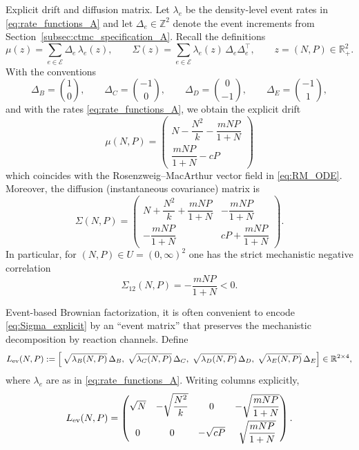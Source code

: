 \documentclass[pdflatex,sn-mathphys-ay]{sn-jnl}
\theoremstyle{thmstyleone}
\theoremstyle{definition}
\theoremstyle{remark}
\begin{document}
Explicit drift and diffusion matrix. Let $\lambda_e$ be the density-level event rates in \eqref{eq:rate_functions_A} and let $\Delta_e\in\mathbb{Z}^2$ denote
the event increments from Section~\ref{subsec:ctmc_specification_A}. Recall the definitions
\begin{equation}\label{eq:mu_Sigma_definitions_A}
\mu(z)=\sum_{e\in\mathcal E}\Delta_e\,\lambda_e(z),
\qquad
\Sigma(z)=\sum_{e\in\mathcal E}\lambda_e(z)\,\Delta_e\Delta_e^\top,
\qquad z=(N,P)\in\mathbb{R}_+^2.
\end{equation}
With the conventions
\[
\Delta_B=\binom{1}{0},\qquad
\Delta_C=\binom{-1}{0},\qquad
\Delta_D=\binom{0}{-1},\qquad
\Delta_E=\binom{-1}{1},
\]
and with the rates \eqref{eq:rate_functions_A}, we obtain the explicit drift
\begin{equation}\label{eq:mu_explicit}
\mu(N,P)=
\begin{pmatrix}
N-\dfrac{N^2}{k}-\dfrac{mNP}{1+N} \\[6pt]
\dfrac{mNP}{1+N}-cP
\end{pmatrix}
\end{equation}
which coincides with the Rosenzweig--MacArthur vector field in \eqref{eq:RM_ODE}. Moreover, the diffusion
(instantaneous covariance) matrix is
\begin{equation}\label{eq:Sigma_explicit}
\Sigma(N,P)=
\begin{pmatrix}
N+\dfrac{N^2}{k}+\dfrac{mNP}{1+N} & -\dfrac{mNP}{1+N}\\[6pt]
-\dfrac{mNP}{1+N} & cP+\dfrac{mNP}{1+N}
\end{pmatrix}.
\end{equation}
In particular, for $(N,P)\in U=(0,\infty)^2$ one has the strict mechanistic negative correlation
\begin{equation}\label{eq:Sigma12_negative_A}
\Sigma_{12}(N,P)=-\frac{mNP}{1+N}<0.
\end{equation}

Event-based Brownian factorization, it is often convenient to encode \eqref{eq:Sigma_explicit} by an ``event matrix'' that preserves the
mechanistic decomposition by reaction channels. Define
\begin{equation}\label{eq:Levent_def_A}
L_{\rm ev}(N,P)
:=
\Bigl[\,
\sqrt{\lambda_B(N,P)}\,\Delta_B,\;
\sqrt{\lambda_C(N,P)}\,\Delta_C,\;
\sqrt{\lambda_D(N,P)}\,\Delta_D,\;
\sqrt{\lambda_E(N,P)}\,\Delta_E
\Bigr]\in\mathbb{R}^{2\times 4},
\end{equation}
where $\lambda_e$ are as in \eqref{eq:rate_functions_A}. Writing columns explicitly,
\begin{equation}\label{eq:Levent_explicit_A}
L_{\rm ev}(N,P)=
\begin{pmatrix}
\sqrt{N} & -\sqrt{\dfrac{N^2}{k}} & 0 & -\sqrt{\dfrac{mNP}{1+N}}\\[8pt]
0 & 0 & -\sqrt{cP} & \sqrt{\dfrac{mNP}{1+N}}
\end{pmatrix}.
\end{equation}
\end{document}
